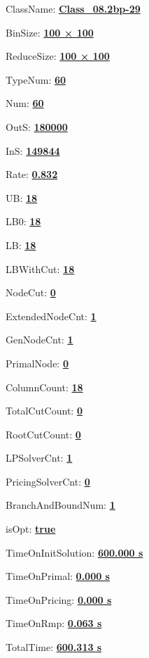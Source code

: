 \documentclass[11pt]{article}
\begin{document}
\pagestyle{empty}


ClassName: \underline{\textbf{Class_08.2bp-29}}
\par
BinSize: \underline{\textbf{100 × 100}}
\par
ReduceSize: \underline{\textbf{100 × 100}}
\par
TypeNum: \underline{\textbf{60}}
\par
Num: \underline{\textbf{60}}
\par
OutS: \underline{\textbf{180000}}
\par
InS: \underline{\textbf{149844}}
\par
Rate: \underline{\textbf{0.832}}
\par
UB: \underline{\textbf{18}}
\par
LB0: \underline{\textbf{18}}
\par
LB: \underline{\textbf{18}}
\par
LBWithCut: \underline{\textbf{18}}
\par
NodeCut: \underline{\textbf{0}}
\par
ExtendedNodeCnt: \underline{\textbf{1}}
\par
GenNodeCnt: \underline{\textbf{1}}
\par
PrimalNode: \underline{\textbf{0}}
\par
ColumnCount: \underline{\textbf{18}}
\par
TotalCutCount: \underline{\textbf{0}}
\par
RootCutCount: \underline{\textbf{0}}
\par
LPSolverCnt: \underline{\textbf{1}}
\par
PricingSolverCnt: \underline{\textbf{0}}
\par
BranchAndBoundNum: \underline{\textbf{1}}
\par
isOpt: \underline{\textbf{true}}
\par
TimeOnInitSolution: \underline{\textbf{600.000 s}}
\par
TimeOnPrimal: \underline{\textbf{0.000 s}}
\par
TimeOnPricing: \underline{\textbf{0.000 s}}
\par
TimeOnRmp: \underline{\textbf{0.063 s}}
\par
TotalTime: \underline{\textbf{600.313 s}}
\par
\newpage


\end{document}
